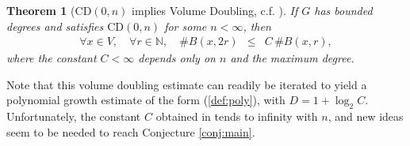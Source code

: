\documentclass[10pt,a4paper]{amsart}
\newtheorem{theorem}{Theorem}
\newcommand{\dN}{\mathbb {N}}
\newcommand{\CD}{\mathrm{CD}}
\begin{document}
\begin{theorem}[$\CD(0,n)$ implies Volume Doubling, c.f. \cite{münch2019,russ2025}]\label{th:dim} If $G$ has bounded degrees and satisfies $\CD(0,n)$ for some $n<\infty$, then 
\begin{eqnarray}
\label{def:VD}
\forall x\in V,\quad \forall r\in\dN,\quad \# B(x,2r) & \le & C\, \# B(x,r),
\end{eqnarray}
where the constant $C<\infty$ depends only on $n$ and the maximum degree. 
\end{theorem}
Note that this volume doubling estimate can readily be iterated to yield a polynomial growth estimate of the form (\ref{def:poly}), with $D=1+\log_2 C$. Unfortunately, the constant $C$ obtained in \cite{münch2019,russ2025} tends to infinity with $n$, and new ideas seem to be needed to reach Conjecture \ref{conj:main}. 
\end{document}
